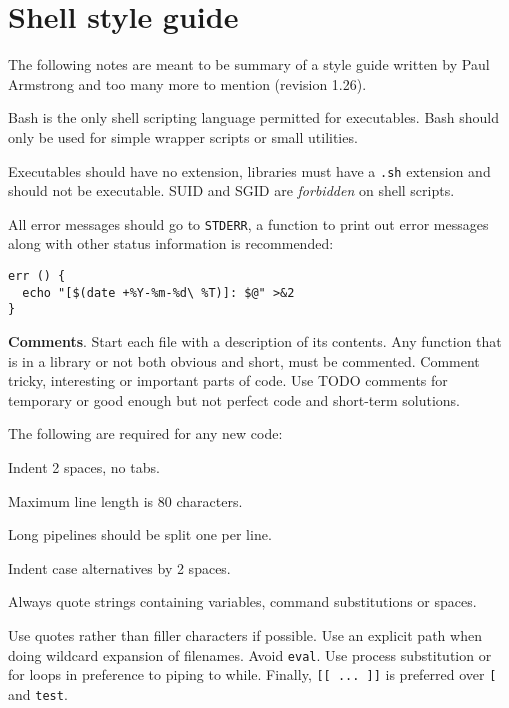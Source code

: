 \section{Shell style guide}
The following notes are meant to be summary of a style guide written by Paul Armstrong and too many more to mention (revision 1.26).

Bash is the only shell scripting language permitted for executables.
Bash should only be used for simple wrapper scripts or small utilities.

Executables should have no extension, libraries must have a \texttt{.sh} extension and should not be executable.
SUID and SGID are \emph{forbidden} on shell scripts.

All error messages should go to \texttt{STDERR},
a function to print out error messages along with other status information is recommended:
\begin{verbatim}
err () {
  echo "[$(date +%Y-%m-%d\ %T)]: $@" >&2
}
\end{verbatim}

\textbf{Comments}.
Start each file with a description of its contents.
Any function that is in a library or not both obvious and short, must be commented.
Comment tricky, interesting or important parts of code.
Use TODO comments for temporary or good enough but not perfect code and short-term solutions.

The following are required for any new code:
\begin{compactenum}
\item Indent 2 spaces, no tabs.
\item Maximum line length is 80 characters.
\item Long pipelines should be split one per line. %
\item Indent case alternatives by 2 spaces.
\item Always quote strings containing variables, command substitutions or spaces. %
\end{compactenum}

Use quotes rather than filler characters if possible.
Use an explicit path when doing wildcard expansion of filenames.
Avoid \texttt{eval}.
Use process substitution or for loops in preference to piping to while.
Finally, \texttt{[[ ... ]]} is preferred over \texttt{[} and \texttt{test}.


